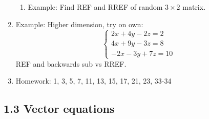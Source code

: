 \documentclass{article}
\begin{document}
\begin{enumerate}
\begin{enumerate}
\item Example: Find REF and RREF of random $3 \times 2$ matrix.

\end{enumerate}


\item Example: Higher dimension, try on own:
\[
\begin{cases}
2x+4y-2z = 2 \\
4x+9y-3z = 8 \\
-2x-3y+7z = 10
\end{cases}
\]
REF and backwards sub vs RREF.

\item Homework: 1, 3, 5, 7, 11, 13, 15, 17, 21, 23, 33-34 

\end{enumerate}

\subsection{1.3 Vector equations}
\end{document}
